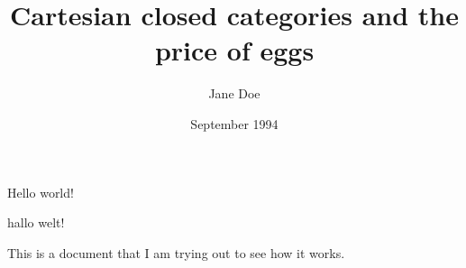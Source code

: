\documentclass{article}
\title{Cartesian closed categories and the price of eggs}
\author{Jane Doe}
\date{September 1994}
\begin{document}
   \maketitle
   Hello world!

   hallo  welt!


   This is a document that I am trying out to see how it works.
\end{document}
